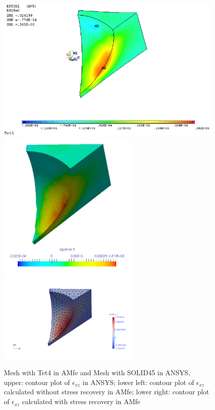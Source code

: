 \begin{figure}[htbp]
	\begin{center}
		\includegraphics[width=13cm,clip]{Tet4Exz.png} 	
		\includegraphics[width=7cm,clip]{Tet4ExzPD.png} 	
		\includegraphics[width=7cm,clip]{Tet4ExzP.png} 		
		\caption{Mesh with Tet4 in AMfe and Mesh with SOLID45 in ANSYS, upper: contour plot of $\epsilon_{xz}$ in ANSYS; lower left: contour plot of $\epsilon_{xz}$ calculated without stress recovery in AMfe; lower right: contour plot of $\epsilon_{xz}$ calculated with stress recovery in AMfe} \label{fig: Tet4_Exz}
	\end{center}
\end{figure}
\clearpage 

